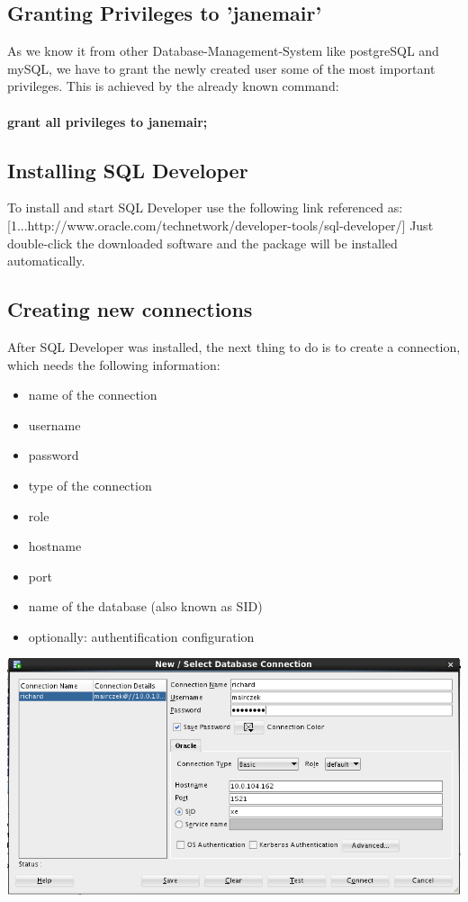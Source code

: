\documentclass[11pt,a4paper]{article}
\begin{document}
\subsection{Granting Privileges to 'janemair'}
As we know it from other Database-Management-System like postgreSQL and mySQL, we have to grant the newly created user some of the most important privileges. This is achieved by the already known command: \\ \\ \textbf{grant all privileges to janemair;}
\subsection{Installing SQL Developer}
To install and start SQL Developer use the following link referenced as: [1...http://www.oracle.com/technetwork/developer-tools/sql-developer/]
Just double-click the downloaded software and the package will be installed automatically.
\subsection{Creating new connections}
After SQL Developer was installed, the next thing to do is to create a connection, which needs the following information:
\begin{itemize}
	\item name of the connection
	\item username
	\item password
	\item type of the connection
	\item role
	\item hostname
	\item port
	\item name of the database (also known as SID)
	\item optionally: authentification configuration 
\end{itemize}
\includegraphics{richard-prop}
\end{document}
